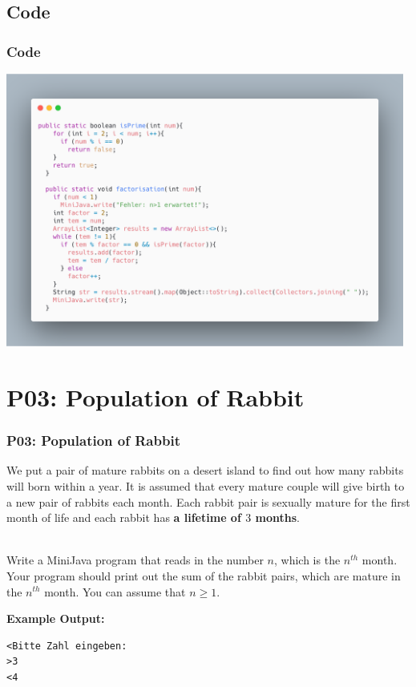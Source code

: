\documentclass[handout, navsym]{tum-presentation}
\numberwithin{equation}{section}
\begin{document}
\subsection{Code}
\begin{frame}[fragile]
\frametitle{Code}

\center \includegraphics[height=9cm]{p2-code.png}

\end{frame}

\section{P03: Population of Rabbit}
\begin{frame}[fragile]
\frametitle{P03: Population of Rabbit}
\vspace*{\fill} \large

We put a pair of mature rabbits on a desert island to find out how many rabbits will born within a year. It is assumed that every mature couple will give birth to a new pair of rabbits each month. Each rabbit pair is sexually mature for the first month of life and each rabbit has \textbf{a lifetime of $3$ months}.\par
~\\
Write a MiniJava program that reads in the number $n$, which is the $n^{th}$ month. Your program should print out the sum of the rabbit pairs, which are mature in the $n^{th}$ month. You can assume that $n \geq 1$. \par
\bigskip
\textbf{\large Example Output:}
\begin{lstlisting}
<Bitte Zahl eingeben:
>3
<4
\end{lstlisting}
\vspace*{\fill}
\end{frame}
\end{document}
